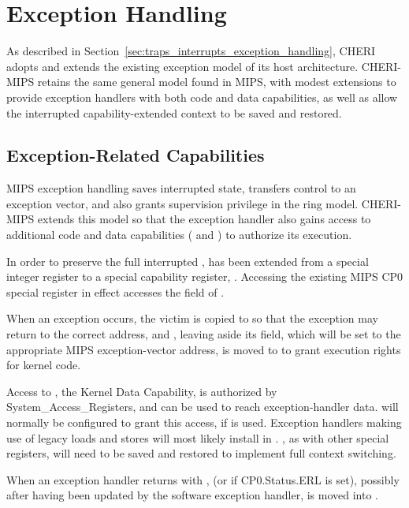 \section{Exception Handling}

As described in Section~\ref{sec:traps_interrupts_exception_handling}, CHERI
adopts and extends the existing exception model of its host architecture.
CHERI-MIPS retains the same general model found in MIPS, with modest
extensions to provide exception handlers with both code and data capabilities,
as well as allow the interrupted capability-extended context to be saved and
restored.

\subsection{Exception-Related Capabilities}

MIPS exception handling saves interrupted state, transfers control to an
exception vector, and also grants supervision privilege in the ring model.
CHERI-MIPS extends this model so that the exception handler also gains access
to additional code and data capabilities (\KCC{} and \KDC{}) to authorize its
execution.

In order to preserve the full interrupted \PCC{}, \EPC{} has been extended
from a special integer register to a special capability register, \EPCC{}.
Accessing the existing MIPS CP0 \EPC{} special register in effect accesses the
\coffset{} field of \EPCC{}.

When an exception occurs, the victim \PCC{} is copied to \EPCC{} so that the
exception may return to the correct address, and \KCC{}, leaving aside its
\coffset{} field, which will be set to the appropriate MIPS exception-vector
address, is moved to \PCC{} to grant execution rights for kernel code.

Access to \KDC{}, the Kernel Data Capability, is authorized by
System\_Access\_Registers, and can be used to reach exception-handler data.
\KCC{} will normally be configured to grant this access, if \KDC{} is used.
Exception handlers making use of legacy loads and stores will most likely
install \KDC{} in \DDC{}.
\DDC{}, as with other special registers, will need to be saved and restored to
implement full context switching.

When an exception handler returns with , \EPCC{} (or \ErrorEPCC{} if CP0.Status.ERL is set), possibly after
having been updated by the software exception handler, is moved into \PCC{}.

